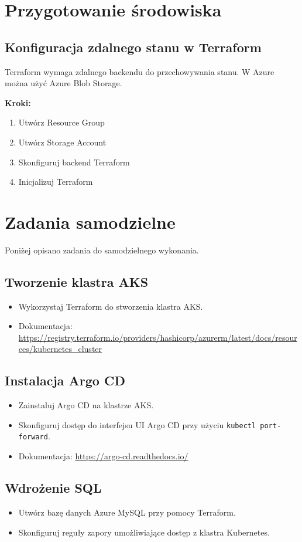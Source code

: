 \documentclass{article}
\begin{document}
\section{Przygotowanie środowiska}
\subsection{Konfiguracja zdalnego stanu w Terraform}
Terraform wymaga zdalnego backendu do przechowywania stanu. W Azure można użyć Azure Blob Storage.

\textbf{Kroki:}
\begin{enumerate}
    \item Utwórz Resource Group
    \item Utwórz Storage Account
    \item Skonfiguruj backend Terraform
    \item Inicjalizuj Terraform
\end{enumerate}

\section{Zadania samodzielne}
Poniżej opisano zadania do samodzielnego wykonania. 

\subsection{Tworzenie klastra AKS}
\begin{itemize}
    \item Wykorzystaj Terraform do stworzenia klastra AKS.
    \item Dokumentacja: \url{https://registry.terraform.io/providers/hashicorp/azurerm/latest/docs/resources/kubernetes_cluster}
\end{itemize}

\subsection{Instalacja Argo CD}
\begin{itemize}
    \item Zainstaluj Argo CD na klastrze AKS.
    \item Skonfiguruj dostęp do interfejsu UI Argo CD przy użyciu \texttt{kubectl port-forward}.
    \item Dokumentacja: \url{https://argo-cd.readthedocs.io/}
\end{itemize}

\subsection{Wdrożenie SQL}
\begin{itemize}
    \item Utwórz bazę danych Azure MySQL przy pomocy Terraform.
    \item Skonfiguruj reguły zapory umożliwiające dostęp z klastra Kubernetes.
\end{itemize}
\end{document}
